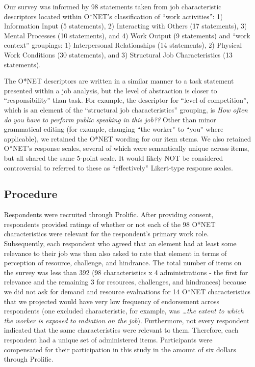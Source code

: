 \documentclass[
  man]{apa6}
\begin{document}
Our survey was informed by 98 statements taken from job characteristic descriptors located within O*NET's classification of ``work activities'': 1) Information Input (5 statements), 2) Interacting with Others (17 statements), 3) Mental Processes (10 statements), and 4) Work Output (9 statements) and ``work context'' groupings: 1) Interpersonal Relationships (14 statements), 2) Physical Work Conditions (30 statements), and 3) Structural Job Characteristics (13 statements).

The O*NET descriptors are written in a similar manner to a task statement presented within a job analysis, but the level of abstraction is closer to ``responsibility'' than task. For example, the descriptor for ``level of competition'', which is an element of the ``structural job characteristics'' grouping, is \emph{How often do you have to perform public speaking in this job??} Other than minor grammatical editing (for example, changing ``the worker'' to ``you'' where applicable), we retained the O*NET wording for our item stems. We also retained O*NET's response scales, several of which were semantically unique across items, but all shared the same 5-point scale. It would likely NOT be considered controversial to referred to these as ``effectively'' Likert-type response scales.

\hypertarget{procedure}{%
\subsection{Procedure}\label{procedure}}

Respondents were recruited through Prolific. After providing consent, respondents provided ratings of whether or not each of the 98 O*NET characteristics were relevant for the respondent's primary work role. Subsequently, each respondent who agreed that an element had at least some relevance to their job was then also asked to rate that element in terms of perception of resource, challenge, and hindrance. The total number of items on the survey was less than 392 (98 characteristics x 4 administrations - the first for relevance and the remaining 3 for resources, challenges, and hindrances) because we did not ask for demand and resource evaluations for 14 O*NET characteristics that we projected would have very low frequency of endorsement across respondents (one excluded characteristic, for example, was \emph{\ldots the extent to which the worker is exposed to radiation on the job}). Furthermore, not every respondent indicated that the same characteristics were relevant to them. Therefore, each respondent had a unique set of administered items. Participants were compensated for their participation in this study in the amount of six dollars through Prolific.
\end{document}

